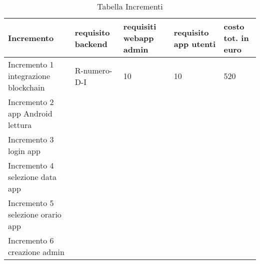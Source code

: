 \hypertarget{TabellaIncrementi}{}
\begin{longtable}{ C{0.15\textwidth} C{0.15\textwidth} C{0.15\textwidth} C{0.15\textwidth} C{0.15\textwidth} }
    \caption{Tabella Incrementi}                                                                                 \\
    \rowcolor{\primaryColor}
    \textcolor{\secondaryColor}{\textbf{Incremento}} & \textcolor{\secondaryColor}{\textbf{requisito backend}}  &\textcolor{\secondaryColor}{\textbf{requisiti webapp admin}}&\textcolor{\secondaryColor}{\textbf{requisito app utenti}}&\textcolor{\secondaryColor}{\textbf{costo tot. in euro}}\\ \endhead
    {Incremento 1 integrazione blockchain} & {R-numero-D-I } & {10 } & {10}&  {520}\\
    {Incremento 2 app Android lettura } & {} & {}& {}& {}\\
    {Incremento 3 login app} & {} & {}& {}& {}\\
    {Incremento 4 selezione data app} & {} & {}& {}& {}\\
    {Incremento 5 selezione orario app} & {} & {}& {}& {}\\
    {Incremento 6 creazione  admin} & {} & {}& {}& {}\\
    
    

\end{longtable}
